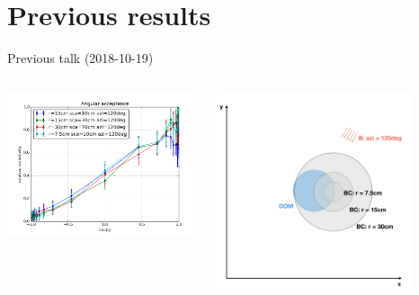 \section{Previous results}
\begin{frame}[fragile]{Previous talk (2018-10-19)}

  \begin{columns}
    \begin{column}{0.5\textwidth}
      \includegraphics[width=\textwidth]{img/summer_scenario_azi120deg_previously}
    \end{column}
    \begin{column}{0.5\textwidth}
      \includegraphics[width=0.8\textwidth]{img/summerscenario-006}
    \end{column}
  \end{columns}


\end{frame}
